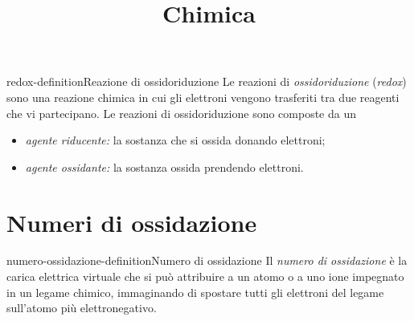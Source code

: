 \documentclass[preview]{standalone}
\begin{document}
\title{Chimica}
\genpage

\begin{snippetdefinition}{redox-definition}{Reazione di ossidoriduzione}
    Le reazioni di \textit{ossidoriduzione} (\textit{redox}) sono una reazione chimica in cui gli elettroni
    vengono trasferiti tra due reagenti che vi partecipano.
    Le reazioni di ossidoriduzione sono composte da un
    \begin{itemize}
        \item \textit{agente riducente:} la sostanza che si ossida donando elettroni;
        \item \textit{agente ossidante:} la sostanza ossida prendendo elettroni.
    \end{itemize}
\end{snippetdefinition}


\section{Numeri di ossidazione}

\begin{snippetdefinition}{numero-ossidazione-definition}{Numero di ossidazione}
    Il \textit{numero di ossidazione} è la carica elettrica virtuale che si può
    attribuire a un atomo o a uno ione impegnato in un legame chimico,
    immaginando di spostare tutti gli elettroni del legame sull'atomo più elettronegativo.
\end{snippetdefinition}
\end{document}
